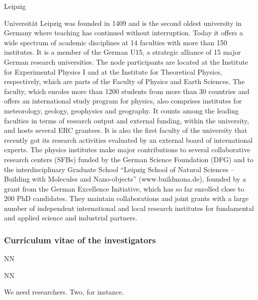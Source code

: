 \begin{sitedescription}{Leipzig} \label{desc:Leipzig}

 Universität Leipzig was founded in 1409 and is the second oldest university in Germany where teaching has continued without interruption. 
  Today it offers a wide spectrum of academic disciplines at 14 faculties with more than 150 institutes. 
  It is a member of the German U15, a strategic alliance of 15 major German research universities. 
  The node participants are located at the Institute for Experimental Physics I and at the Institute for Theoretical Physics, respectively, which are parts of the Faculty of Physics and Earth Sciences. 
  The faculty, which enroles more than 1200 students from more than 30 countries and offers an international study program for physics, also comprises institutes for meteorology, geology, geophysics and geography. 
  It counts among the leading faculties in terms of research output and external funding, within the university, and hosts several ERC grantees. 
  It is also the first faculty of the university that recently got its research activities evaluated by an external board of international experts. 
  The physics institutes make major contributions to several collaborative research centers (SFBs) funded by the German Science Foundation (DFG) and to the interdisciplinary Graduate School ``Leipzig School of Natural Sciences -- Building with Molecules and Nano-objects'' (www.buildmona.de), founded by a grant from the German Excellence Initiative, which has so far enrolled close to 200 PhD candidates. 
  They maintain collaborations and joint grants with a large number of independent international and local research institutes for fundamental and applied science and industrial partners. 

\subsubsection*{Curriculum vitae of the investigators}




\begin{participant}[type=res,PM=48,salary=5500]{NN}
\end{participant}
\begin{participant}[type=res,PM=36,salary=5500]{NN}

We need researchers. Two, for instance.

\end{participant}


\end{sitedescription}
